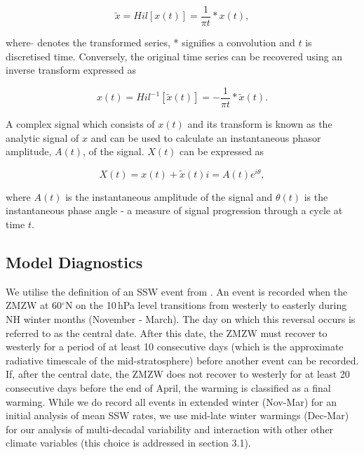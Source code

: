 \documentclass[wcd, manuscript]{copernicus}
\begin{document}
\begin{equation} \label{theoretical_fourier}
\tilde{x} = Hil[x(t)] = \frac{1}{\pi t} * x(t),
\end{equation}

where $\tilde{}$ denotes the transformed series, * signifies a convolution and $t$ is discretised time. Conversely, the original time series can be recovered using an inverse transform expressed as

\begin{equation} \label{theoretical_fourier}
{x(t)} = Hil^{-1}[\tilde{x}(t)] = -\frac{1}{\pi t} * \tilde{x}(t).
\end{equation}

A complex signal which consists of $x(t)$ and its transform is known as the analytic signal of $x$ and can be used to calculate an instantaneous phasor amplitude, $A(t)$, of the signal. $X(t)$ can be expressed as

\begin{equation} \label{theoretical_fourier}
X(t) = x(t) + \tilde{x}(t) i = A(t) e^{i\theta},
\end{equation}

where $A(t)$ is the instantaneous amplitude of the signal and $\theta(t)$ is the instantaneous phase angle - a measure of signal progression through a cycle at time $t$.

\subsection{Model Diagnostics}
We utilise the definition of an SSW event from \cite{Butler2015}. An event is recorded when the ZMZW at 60$^\circ$N on the 10\,hPa level transitions from westerly to easterly during NH winter months (November - March). The day on which this reversal occurs is referred to as the central date. After this date, the ZMZW must recover to westerly for a period of at least 10 consecutive days (which is the approximate radiative timescale of the mid-stratosphere) before another event can be recorded.  If, after the central date, the ZMZW does not recover to westerly for at least 20 consecutive days before the end of April, the warming is classified as a final warming. While we do record all events in extended winter (Nov-Mar) for an initial analysis of mean SSW rates, we use mid-late winter warmings (Dec-Mar) for our analysis of multi-decadal variability and interaction with other other climate variables (this choice is addressed in section 3.1).
\end{document}
